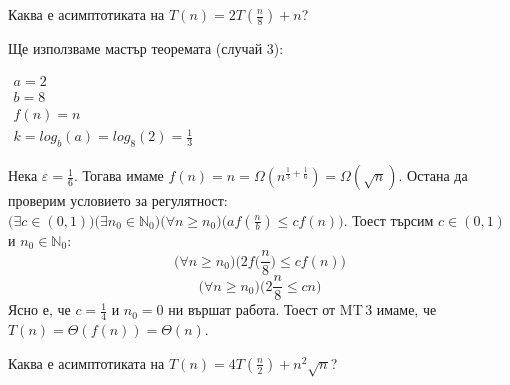 \begin{problem}
	Каква е асимптотиката на $T(n)=2T(\frac n8)+n$?
\end{problem}

\begin{solution}
	Ще използваме $\hyperref[th:master-theorem]{\text{мастър теоремата}}$ (случай 3):
	\begin{center}
		$\begin{array}{|l}
			a=2\\
			b=8\\
			f(n)=n\\
			k=log_b(a)=log_8(2)=\frac13
		\end{array}$
	\end{center}
	Нека $\varepsilon=\frac16$. Тогава имаме $f(n)=n=\Omega(n^{\frac13+\frac16})=\Omega(\sqrt n)$. Остана да проверим условието за регулятност: $\big(\exists c\!\in\!(0,1)\big)\big(\exists n_0\!\in\!\mathbb{N}_0\big)\big(\forall n\!\ge\! n_0\big)\big(af(\frac nb)\!\le\! cf(n)\big)$. Тоест търсим $c\!\in\!(0,1)$ и $n_0\!\in\!\mathbb{N}_0$:
	\begin{equation*}
		\big(\forall n\ge n_0\big)\bigg(2f\Big(\frac n8\Big)\le cf(n)\bigg)
	\end{equation*}
	\begin{equation*}
		\big(\forall n\ge n_0\big)\bigg(2\frac n8\le cn\bigg)
	\end{equation*}
	Ясно е, че $c=\frac14$ и $n_0=0$ ни вършат работа. Тоест от MT\,3 имаме, че $T(n)=\Theta(f(n))=\Theta(n)$.
\end{solution}\leavevmode\newline

\begin{problem}
	Каква е асимптотиката на $T(n)=4T(\frac n2)+n^2\sqrt n$?
\end{problem}

